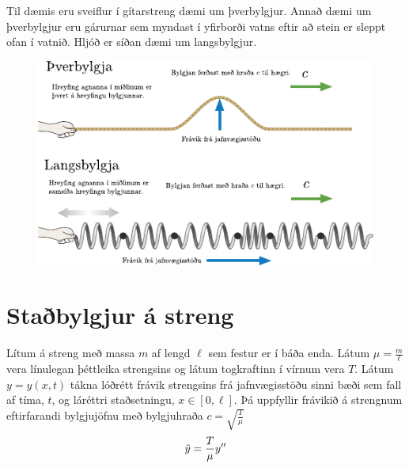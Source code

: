 \ifdefined \wholebook \else\documentclass[oneside]{book}\usepackage{EdlBook}\graphicspath{{figures/}}
\begin{document}
Til dæmis eru sveiflur í gítarstreng dæmi um þverbylgjur. Annað dæmi um þverbylgjur eru gárurnar sem myndast í yfirborði vatns eftir að stein er sleppt ofan í vatnið. Hljóð er síðan dæmi um langsbylgjur.

\begin{figure}[H]
    \centering
    \includegraphics{figures/langs-thver.pdf}
\end{figure}

\section{Staðbylgjur á streng} 

\begin{tcolorbox}
\begin{theorem}
Lítum á streng með massa $m$ af lengd $\ell$ sem festur er í báða enda. Látum $\mu = \frac{m}{\ell}$ vera línulegan þéttleika strengsins og látum togkraftinn í vírnum vera $T$. Látum $y = y(x,t)$ tákna lóðrétt frávik strengsins frá jafnvægisstöðu sinni bæði sem fall af tíma, $t$, og láréttri staðsetningu, $x \in [0,\ell]$. Þá uppfyllir frávikið á strengnum eftirfarandi bylgjujöfnu með bylgjuhraða $c = \sqrt{\frac{T}{\mu}}$
\begin{align*}
    \Ddot{y} = \frac{T}{\mu} y''
\end{align*}
\end{theorem}
\end{tcolorbox}
\end{document}
